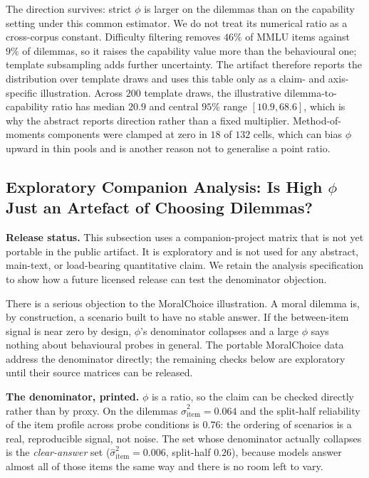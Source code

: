 \documentclass[11pt]{article}
\begin{document}
The direction survives: strict $\phi$ is larger on the dilemmas than on the
capability setting under this common estimator. We do not treat its numerical
ratio as a cross-corpus constant. Difficulty filtering removes $46\%$ of MMLU
items against $9\%$ of dilemmas, so it raises the capability value more than the
behavioural one; template subsampling adds further uncertainty. The artifact
therefore reports the distribution over template draws and uses this table only
as a claim- and axis-specific illustration. Across $200$ template draws, the
illustrative dilemma-to-capability ratio has median $20.9$ and central $95\%$
range $[10.9,68.6]$, which is why the abstract reports direction rather than a
fixed multiplier. Method-of-moments components were clamped at zero in $18$ of
$132$ cells, which can bias $\phi$ upward in thin pools and is another reason
not to generalise a point ratio.

\subsection{Exploratory Companion Analysis: Is High $\phi$ Just an Artefact of
Choosing Dilemmas?}
\label{app:positivecontrol}

\textbf{Release status.} This subsection uses a companion-project matrix that
is not yet portable in the public artifact. It is exploratory and is not used
for any abstract, main-text, or load-bearing quantitative claim. We retain the
analysis specification to show how a future licensed release can test the
denominator objection.

There is a serious objection to the MoralChoice illustration. A moral dilemma is, by
construction, a scenario built to have no stable answer. If the between-item
signal is near zero by design, $\phi$'s denominator collapses and a large $\phi$
says nothing about behavioural probes in general. The portable MoralChoice data
address the denominator directly; the remaining checks below are exploratory
until their source matrices can be released.

\textbf{The denominator, printed.} $\phi$ is a ratio, so the claim can be checked
directly rather than by proxy. On the dilemmas $\hat\sigma^2_{\text{item}}=0.064$
and the split-half reliability of the item profile across probe conditions is
$0.76$: the ordering of scenarios is a real, reproducible signal, not noise. The
set whose denominator actually collapses is the \emph{clear-answer} set
($\hat\sigma^2_{\text{item}}=0.006$, split-half $0.26$), because models answer
almost all of those items the same way and there is no room left to vary.
\end{document}
